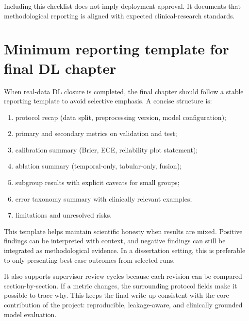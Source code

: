 Including this checklist does not imply deployment approval. It documents that methodological reporting is aligned with expected clinical-research standards.

\section{Minimum reporting template for final DL chapter}
When real-data DL closure is completed, the final chapter should follow a stable reporting template to avoid selective emphasis. A concise structure is:
\begin{enumerate}[leftmargin=1.2cm]
    \item protocol recap (data split, preprocessing version, model configuration);
    \item primary and secondary metrics on validation and test;
    \item calibration summary (Brier, ECE, reliability plot statement);
    \item ablation summary (temporal-only, tabular-only, fusion);
    \item subgroup results with explicit caveats for small groups;
    \item error taxonomy summary with clinically relevant examples;
    \item limitations and unresolved risks.
\end{enumerate}

This template helps maintain scientific honesty when results are mixed. Positive findings can be interpreted with context, and negative findings can still be integrated as methodological evidence. In a dissertation setting, this is preferable to only presenting best-case outcomes from selected runs.

It also supports supervisor review cycles because each revision can be compared section-by-section. If a metric changes, the surrounding protocol fields make it possible to trace why. This keeps the final write-up consistent with the core contribution of the project: reproducible, leakage-aware, and clinically grounded model evaluation.
